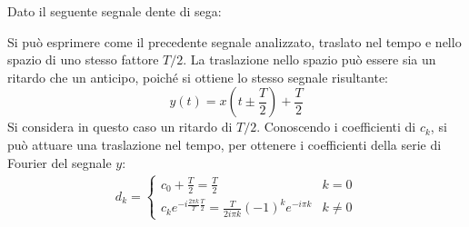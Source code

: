 \documentclass{article}
\numberwithin{equation}{subsection}
\begin{document}
Dato il seguente segnale dente di sega:
\begin{center}
\end{center}
Si può esprimere come il precedente segnale analizzato, traslato nel tempo e nello spazio di uno stesso fattore $T/2$. La traslazione nello spazio può essere sia un ritardo 
che un anticipo, poiché si ottiene lo stesso segnale risultante:
\begin{equation*}
    y(t)=x\left(t\pm\frac{T}{2}\right)+\displaystyle\frac{T}{2}
\end{equation*}
Si considera in questo caso un ritardo di $T/2$. Conoscendo i coefficienti di $c_k$, si può attuare una traslazione nel tempo, per ottenere i coefficienti della serie di Fourier 
del segnale $y$:
\begin{gather*}
    d_k=\begin{cases}
        \displaystyle c_0+\frac{T}{2}=\frac{T}{2} &k=0\\
        c_ke^{-i\frac{2\pi k}{T}\frac{T}{2}}=\displaystyle\frac{T}{2i\pi k}(-1)^ke^{-i\pi k}&k\neq0
    \end{cases}
\end{gather*}
\end{document}
